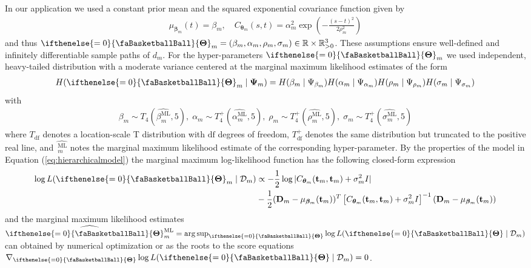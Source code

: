 \documentclass[
  11pt,
]{svjour3}
\theoremstyle{nonumberplain}
\begin{document}
In our application we used a constant prior mean and the squared
exponential covariance function given by \begin{align*}
  \mu_{\bm{\beta}_m}(t) = \beta_m, \quad C_{\bm{\theta}_m}(s, t) = \alpha^2_m\exp\left(-\frac{(s-t)^2}{2\rho^2_m}\right)
\end{align*} and thus
\(\ifthenelse{\value{bbsym4theta}=0}{\text{\faBasketballBall}}{\mathbf{\Theta}}_m = (\beta_m,\alpha_m, \rho_m, \sigma_m) \in \mathbb{R} \times \mathbb{R}_{>0}^3\).
These assumptions ensure well-defined and infinitely differentiable
sample paths of \(d_m\). For the hyper-parameters
\(\ifthenelse{\value{bbsym4theta}=0}{\text{\faBasketballBall}}{\mathbf{\Theta}}_m\)
we used independent, heavy-tailed distribution with a moderate variance
centered at the marginal maximum likelihood estimates of the form
\begin{align*}
H(\ifthenelse{\value{bbsym4theta}=0}{\text{\faBasketballBall}}{\mathbf{\Theta}}_m \mid \bm{\Psi}_m) = H(\beta_m \mid \Psi_{\beta_m})H(\alpha_m \mid \Psi_{\alpha_m})H(\rho_m \mid \Psi_{\rho_m})H(\sigma_m \mid \Psi_{\sigma_m})
\end{align*} with \begin{align*}
\beta_{m} \sim T_4\left(\widehat{\beta_m^\text{ML}}, 5\right), \; \alpha_m \sim T^+_4\left(\widehat{\alpha_m^\text{ML}}, 5\right), \; \rho_m \sim T_4^+\left(\widehat{\rho_m^\text{ML}}, 5\right), \; \sigma_m \sim T^+_4\left(\widehat{\sigma_m^\text{ML}}, 5\right)
\end{align*} where \(T_{\text{df}}\) denotes a location-scale T
distribution with \(\mathrm{df}\) degrees of freedom,
\(T_{\text{df}}^+\) denotes the same distribution but truncated to the
positive real line, and \(\widehat{\,_m^\text{ML}}\) notes the marginal
maximum likelihood estimate of the corresponding hyper-parameter. By the
properties of the model in Equation (\ref{eq:hierarchicalmodel}) the
marginal maximum log-likelihood function has the following closed-form
expression \begin{align*}
\log L(\ifthenelse{\value{bbsym4theta}=0}{\text{\faBasketballBall}}{\mathbf{\Theta}}_m \mid \mathcal{D}_m) &\propto - \frac{1}{2}\log |C_{\bm{\theta}_m}(\mathbf{t}_m, \mathbf{t}_m) + \sigma_m^2 I|\\
&- \frac{1}{2}(\mathbf{D}_m - \mu_{\bm{\beta}_m}(\mathbf{t}_m))^T\left[C_{\bm{\theta}_m}(\mathbf{t}_m, \mathbf{t}_m) + \sigma_m^2 I\right]^{-1}(\mathbf{D}_m - \mu_{\bm{\beta}_m}(\mathbf{t}_m))
\end{align*} and the marginal maximum likelihood estimates
\(\widehat{\ifthenelse{\value{bbsym4theta}=0}{\text{\faBasketballBall}}{\mathbf{\Theta}}_m^\text{ML}} = \mathop{\mathrm{arg\,sup}}_{\ifthenelse{\value{bbsym4theta}=0}{\text{\faBasketballBall}}{\mathbf{\Theta}}} \log L(\ifthenelse{\value{bbsym4theta}=0}{\text{\faBasketballBall}}{\mathbf{\Theta}}\mid \mathcal{D}_m)\)
can obtained by numerical optimization or as the roots to the score
equations
\(\nabla_{\ifthenelse{\value{bbsym4theta}=0}{\text{\faBasketballBall}}{\mathbf{\Theta}}} \log L(\ifthenelse{\value{bbsym4theta}=0}{\text{\faBasketballBall}}{\mathbf{\Theta}}\mid \mathcal{D}_m) = 0\).
\end{document}

